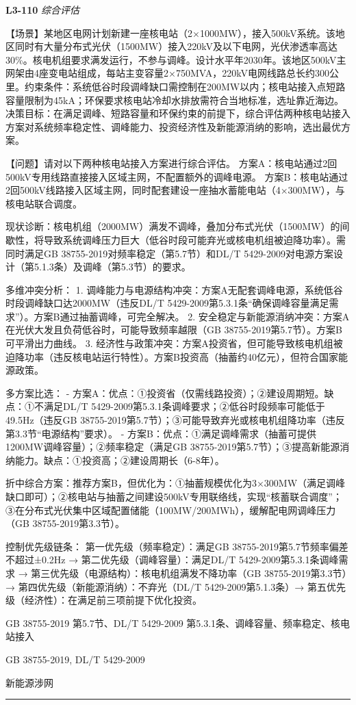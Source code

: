 \documentclass[12pt,a4paper]{ctexart}
\begin{document}
\noindent\textbf{L3-110} \hfill \textit{综合评估}
\begin{description}[leftmargin=1.5em,style=nextline,font=\normalfont]
  \item[Q:] 【场景】某地区电网计划新建一座核电站（2×1000MW），接入500kV系统。该地区同时有大量分布式光伏（1500MW）接入220kV及以下电网，光伏渗透率高达30\%。核电机组要求满发运行，不参与调峰。设计水平年2030年。该地区500kV主网架由4座变电站组成，每站主变容量2×750MVA，220kV电网线路总长约300公里。约束条件：系统低谷时段调峰缺口需控制在200MW以内；核电站接入点短路容量限制为45kA；环保要求核电站冷却水排放需符合当地标准，选址靠近海边。决策目标：在满足调峰、短路容量和环保约束的前提下，综合评估两种核电站接入方案对系统频率稳定性、调峰能力、投资经济性及新能源消纳的影响，选出最优方案。

【问题】请对以下两种核电站接入方案进行综合评估。
方案A：核电站通过2回500kV专用线路直接接入区域主网，不配置额外的调峰电源。
方案B：核电站通过2回500kV线路接入区域主网，同时配套建设一座抽水蓄能电站（4×300MW），与核电站联合调度。
  \item[A:] 现状诊断：核电机组（2000MW）满发不调峰，叠加分布式光伏（1500MW）的间歇性，将导致系统调峰压力巨大（低谷时段可能弃光或核电机组被迫降功率）。需同时满足GB 38755-2019对频率稳定（第5.7节）和DL/T 5429-2009对电源方案设计（第5.1.3条）及调峰（第5.3节）的要求。

多维冲突分析：
1. 调峰能力与电源结构冲突：方案A无配套调峰电源，系统低谷时段调峰缺口达2000MW（违反DL/T 5429-2009第5.3.1条“确保调峰容量满足需求”）。方案B通过抽蓄调峰，可完全解决。
2. 安全稳定与新能源消纳冲突：方案A在光伏大发且负荷低谷时，可能导致频率越限（GB 38755-2019第5.7节）。方案B可平滑出力曲线。
3. 经济性与政策冲突：方案A投资省，但可能导致核电机组被迫降功率（违反核电站运行特性）。方案B投资高（抽蓄约40亿元），但符合国家能源政策。

多方案比选：
- 方案A：优点：①投资省（仅需线路投资）；②建设周期短。缺点：①不满足DL/T 5429-2009第5.3.1条调峰要求；②低谷时段频率可能低于49.5Hz（违反GB 38755-2019第5.7节）；③可能导致弃光或核电机组降功率（违反第3.3节“电源结构”要求）。
- 方案B：优点：①满足调峰需求（抽蓄可提供1200MW调峰容量）；②频率稳定（满足GB 38755-2019第5.7节）；③提高新能源消纳能力。缺点：①投资高；②建设周期长（6-8年）。

折中综合方案：推荐方案B，但优化为：①抽蓄规模优化为3×300MW（满足调峰缺口即可）；②核电站与抽蓄之间建设500kV专用联络线，实现“核蓄联合调度”；③在分布式光伏集中区域配置储能（100MW/200MWh），缓解配电网调峰压力（GB 38755-2019第3.3节）。

控制优先级链条：
第一优先级（频率稳定）：满足GB 38755-2019第5.7节频率偏差不超过±0.2Hz → 第二优先级（调峰容量）：满足DL/T 5429-2009第5.3.1条调峰需求 → 第三优先级（电源结构）：核电机组满发不降功率（GB 38755-2019第3.3节）→ 第四优先级（新能源消纳）：不弃光（DL/T 5429-2009第5.1.3条）→ 第五优先级（经济性）：在满足前三项前提下优化投资。
  \item[KW:] GB 38755-2019 第5.7节、DL/T 5429-2009 第5.3.1条、调峰容量、频率稳定、核电站接入
  \item[Std:] GB 38755-2019, DL/T 5429-2009
  \item[Topic:] 新能源涉网
\end{description}
\vspace{4pt}
\hrule\vspace{6pt}
\end{document}
